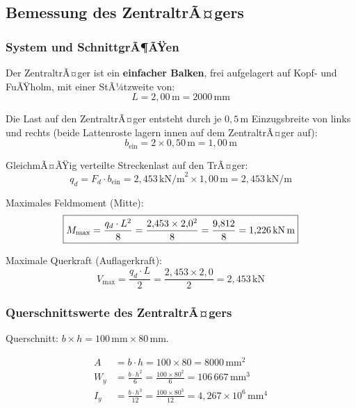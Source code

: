 ﻿\documentclass[12pt,a4paper]{article}
\theoremstyle{definition}
\theoremstyle{plain}
\theoremstyle{remark}
\begin{document}
\subsection{Bemessung des ZentraltrÃ¤gers}

\subsubsection{System und SchnittgrÃ¶ÃŸen}

Der ZentraltrÃ¤ger ist ein \textbf{einfacher Balken}, frei aufgelagert auf Kopf- und
FuÃŸholm, mit einer StÃ¼tzweite von:
\begin{equation}
  L = 2{,}00\,\text{m} = 2000\,\text{mm}
\end{equation}

Die Last auf den ZentraltrÃ¤ger entsteht durch je $0{,}5\,\text{m}$ Einzugsbreite
von links und rechts (beide Lattenroste lagern innen auf dem ZentraltrÃ¤ger auf):
\begin{equation}
  b_{\text{ein}} = 2 \times 0{,}50\,\text{m} = 1{,}00\,\text{m}
\end{equation}

GleichmÃ¤ÃŸig verteilte Streckenlast auf den TrÃ¤ger:
\begin{equation}
  \boxed{q_d = F_d \cdot b_{\text{ein}} = 2{,}453\,\text{kN/m}^2 \times 1{,}00\,\text{m}
  = 2{,}453\,\text{kN/m}}
\end{equation}

Maximales Feldmoment (Mitte):
\begin{equation}
  \boxed{M_{\max} = \frac{q_d \cdot L^2}{8} = \frac{2{,}453 \times 2{,}0^2}{8}
  = \frac{9{,}812}{8} = 1{,}226\,\text{kN\,m}}
\end{equation}

Maximale Querkraft (Auflagerkraft):
\begin{equation}
  \boxed{V_{\max} = \frac{q_d \cdot L}{2} = \frac{2{,}453 \times 2{,}0}{2}
  = 2{,}453\,\text{kN}}
\end{equation}

\subsubsection{Querschnittswerte des ZentraltrÃ¤gers}

Querschnitt: $b \times h = 100\,\text{mm} \times 80\,\text{mm}$.

\begin{align}
  A   &= b \cdot h = 100 \times 80 = 8000\,\text{mm}^2 \\
  W_y &= \frac{b \cdot h^2}{6} = \frac{100 \times 80^2}{6} = 106\,667\,\text{mm}^3 \\
  I_y &= \frac{b \cdot h^3}{12} = \frac{100 \times 80^3}{12} = 4{,}267 \times 10^6\,\text{mm}^4
\end{align}
\end{document}
